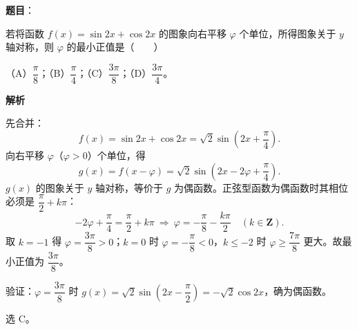 \begin{answer}

\textbf{题目}：

若将函数 $f(x)=\sin2x+\cos2x$ 的图象向右平移 $\varphi$ 个单位，所得图象关于 $y$ 轴对称，则 $\varphi$ 的最小正值是\mbox{（　　）}

（A）$\dfrac\pi8$；（B）$\dfrac\pi4$；（C）$\dfrac{3\pi}8$；（D）$\dfrac{3\pi}4$。

\textbf{解析}

先合并：
\nopagebreak[4]
\[f(x)=\sin2x+\cos2x=\sqrt2\sin\left(2x+\frac\pi4\right).\]
向右平移 $\varphi$（$\varphi>0$）个单位，得
\nopagebreak[4]
\[g(x)=f(x-\varphi)=\sqrt2\sin\left(2x-2\varphi+\frac\pi4\right).\]
$g(x)$ 的图象关于 $y$ 轴对称，等价于 $g$ 为偶函数。正弦型函数为偶函数时其相位必须是 $\dfrac\pi2+k\pi$：
\nopagebreak[4]
\[-2\varphi+\frac\pi4=\frac\pi2+k\pi\ \Longrightarrow\ \varphi=-\frac\pi8-\frac{k\pi}2\quad(k\in\mathbf Z).\]
取 $k=-1$ 得 $\varphi=\dfrac{3\pi}8>0$；$k=0$ 时 $\varphi=-\dfrac\pi8<0$，$k\leqslant-2$ 时 $\varphi\geqslant\dfrac{7\pi}8$ 更大。故最小正值为 $\dfrac{3\pi}8$。

验证：$\varphi=\dfrac{3\pi}8$ 时 $g(x)=\sqrt2\sin\left(2x-\dfrac\pi2\right)=-\sqrt2\cos2x$，确为偶函数。

选 C。


\end{answer}
